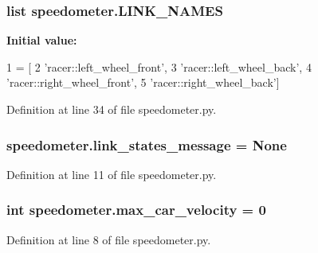 \subsubsection[{\texorpdfstring{L\+I\+N\+K\+\_\+\+N\+A\+M\+ES}{LINK_NAMES}}]{\setlength{\rightskip}{0pt plus 5cm}list speedometer.\+L\+I\+N\+K\+\_\+\+N\+A\+M\+ES}\hypertarget{namespacespeedometer_ade01e300777f9944bd7c39c26cf8552e}{}\label{namespacespeedometer_ade01e300777f9944bd7c39c26cf8552e}
{\bfseries Initial value\+:}
\begin{DoxyCode}
1 = [
2     \textcolor{stringliteral}{'racer::left\_wheel\_front'},
3     \textcolor{stringliteral}{'racer::left\_wheel\_back'},
4     \textcolor{stringliteral}{'racer::right\_wheel\_front'},
5     \textcolor{stringliteral}{'racer::right\_wheel\_back'}]
\end{DoxyCode}


Definition at line 34 of file speedometer.\+py.

\subsubsection[{\texorpdfstring{link\+\_\+states\+\_\+message}{link_states_message}}]{\setlength{\rightskip}{0pt plus 5cm}speedometer.\+link\+\_\+states\+\_\+message = None}\hypertarget{namespacespeedometer_a030c5ef20479fe5a9bdc7018cefc3d88}{}\label{namespacespeedometer_a030c5ef20479fe5a9bdc7018cefc3d88}


Definition at line 11 of file speedometer.\+py.

\subsubsection[{\texorpdfstring{max\+\_\+car\+\_\+velocity}{max_car_velocity}}]{\setlength{\rightskip}{0pt plus 5cm}int speedometer.\+max\+\_\+car\+\_\+velocity = 0}\hypertarget{namespacespeedometer_a11f245c5d45ac2b534d8d0b46e877dfc}{}\label{namespacespeedometer_a11f245c5d45ac2b534d8d0b46e877dfc}


Definition at line 8 of file speedometer.\+py.

